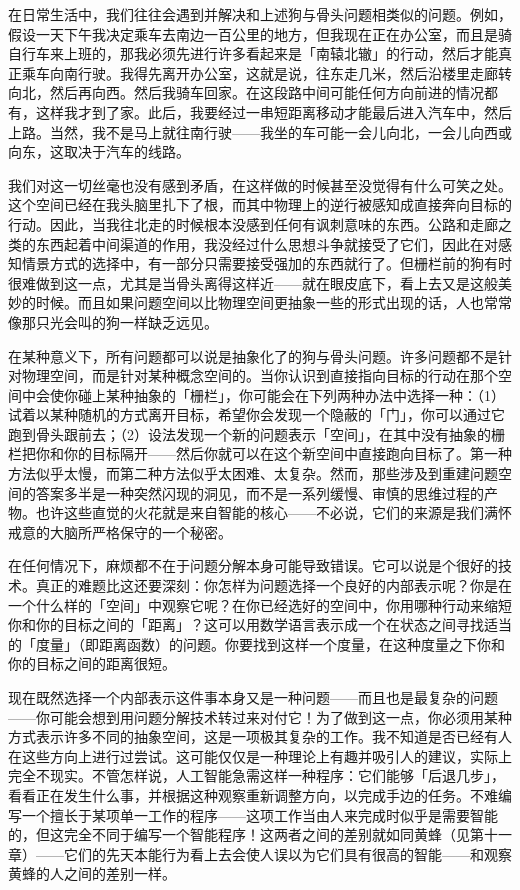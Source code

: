 \documentclass[
  12pt,
  twoside,
  openright,
  oldfontcommands,
]{memoir}
\begin{document}
在日常生活中，我们往往会遇到并解决和上述狗与骨头问题相类似的问题。例如，假设一天下午我决定乘车去南边一百公里的地方，但我现在正在办公室，而且是骑自行车来上班的，那我必须先进行许多看起来是「南辕北辙」的行动，然后才能真正乘车向南行驶。我得先离开办公室，这就是说，往东走几米，然后沿楼里走廊转向北，然后再向西。然后我骑车回家。在这段路中间可能任何方向前进的情况都有，这样我才到了家。此后，我要经过一串短距离移动才能最后进入汽车中，然后上路。当然，我不是马上就往南行驶------我坐的车可能一会儿向北，一会儿向西或向东，这取决于汽车的线路。

我们对这一切丝毫也没有感到矛盾，在这样做的时候甚至没觉得有什么可笑之处。这个空间已经在我头脑里扎下了根，而其中物理上的逆行被感知成直接奔向目标的行动。因此，当我往北走的时候根本没感到任何有讽刺意味的东西。公路和走廊之类的东西起着中间渠道的作用，我没经过什么思想斗争就接受了它们，因此在对感知情景方式的选择中，有一部分只需要接受强加的东西就行了。但栅栏前的狗有时很难做到这一点，尤其是当骨头离得这样近------就在眼皮底下，看上去又是这般美妙的时候。而且如果问题空间以比物理空间更抽象一些的形式出现的话，人也常常像那只光会叫的狗一样缺乏远见。

在某种意义下，所有问题都可以说是抽象化了的狗与骨头问题。许多问题都不是针对物理空间，而是针对某种概念空间的。当你认识到直接指向目标的行动在那个空间中会使你碰上某种抽象的「栅栏」，你可能会在下列两种办法中选择一种：（1）试着以某种随机的方式离开目标，希望你会发现一个隐蔽的「门」，你可以通过它跑到骨头跟前去；（2）设法发现一个新的问题表示「空间」，在其中没有抽象的栅栏把你和你的目标隔开------然后你就可以在这个新空间中直接跑向目标了。第一种方法似乎太慢，而第二种方法似乎太困难、太复杂。然而，那些涉及到重建问题空间的答案多半是一种突然闪现的洞见，而不是一系列缓慢、审慎的思维过程的产物。也许这些直觉的火花就是来自智能的核心------不必说，它们的来源是我们满怀戒意的大脑所严格保守的一个秘密。

在任何情况下，麻烦都不在于问题分解本身可能导致错误。它可以说是个很好的技术。真正的难题比这还要深刻：你怎样为问题选择一个良好的内部表示呢？你是在一个什么样的「空间」中观察它呢？在你已经选好的空间中，你用哪种行动来缩短你和你的目标之间的「距离」？这可以用数学语言表示成一个在状态之间寻找适当的「度量」（即距离函数）的问题。你要找到这样一个度量，在这种度量之下你和你的目标之间的距离很短。

现在既然选择一个内部表示这件事本身又是一种问题------而且也是最复杂的问题------你可能会想到用问题分解技术转过来对付它！为了做到这一点，你必须用某种方式表示许多不同的抽象空间，这是一项极其复杂的工作。我不知道是否已经有人在这些方向上进行过尝试。这可能仅仅是一种理论上有趣并吸引人的建议，实际上完全不现实。不管怎样说，人工智能急需这样一种程序：它们能够「后退几步」，看看正在发生什么事，并根据这种观察重新调整方向，以完成手边的任务。不难编写一个擅长于某项单一工作的程序------这项工作当由人来完成时似乎是需要智能的，但这完全不同于编写一个智能程序！这两者之间的差别就如同黄蜂（见第十一章）------它们的先天本能行为看上去会使人误以为它们具有很高的智能------和观察黄蜂的人之间的差别一样。
\end{document}
